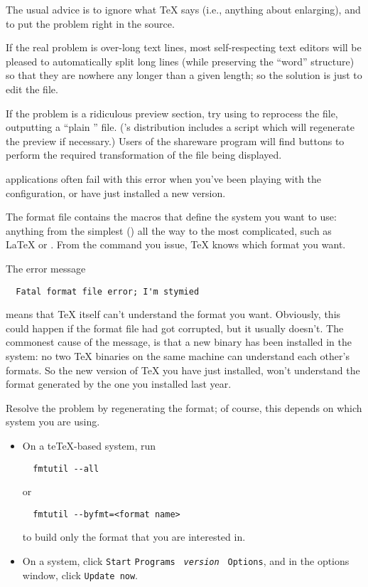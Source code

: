 {The usual advice is to ignore what \TeX{} says (i.e., anything about
enlarging), and to put the problem right in the source. 

If the real problem is over-long text lines, most self-respecting text
editors will be pleased to automatically split long lines (while
preserving the ``word'' structure) so that they are nowhere any longer
than a given length; so the solution is just to edit the file.

If the problem is a ridiculous preview section, try using
\href{http://www.ghostscript.com/}{}
to reprocess the file, outputting a ``plain
'' file.  ('s distribution
includes a script  which will regenerate the preview
if necessary.)  Users of the shareware program %
\href{http://www.ghostgum.com.au/}{}
will find buttons to perform the required transformation of the file
being displayed.


\AllTeX{} applications often fail with this error when you've been
playing with the configuration, or have just installed a new version.

The format file contains the macros that define the system you want to
use: anything from the simplest (\plaintex{}) all the way to the most
complicated, such as \LaTeX{} or \CONTeXT{}.  From the command you
issue, \TeX{} knows which format you want.

The error message
\begin{verbatim}
  Fatal format file error; I'm stymied
\end{verbatim}
means that \TeX{} itself can't understand the format you want.
Obviously, this could happen if the format file had got corrupted, but
it usually doesn't.  The commonest cause of the message, is that a new
binary has been installed in the system: no two \TeX{} binaries on the
same machine can
understand each other's formats.  So the new version of \TeX{} you
have just installed, won't understand the format generated by the one
you installed last year.

Resolve the problem by regenerating the format; of course, this
depends on which system you are using.
\begin{itemize}
\item On a te\TeX{}-based system, run
\begin{verbatim}
  fmtutil --all
\end{verbatim}
  or
\begin{verbatim}
  fmtutil --byfmt=<format name>
\end{verbatim}
  to build only the format that you are interested in.
\item On a \miktex{} system, click \texttt{Start}\arrowhyph{}%
\texttt{Programs}\arrowhyph{}%
\texttt{\miktex{} \emph{version}}\arrowhyph{}%
\texttt{\miktex{} Options}, and in the options window, click
  \texttt{Update now}.
\end{itemize}

}
